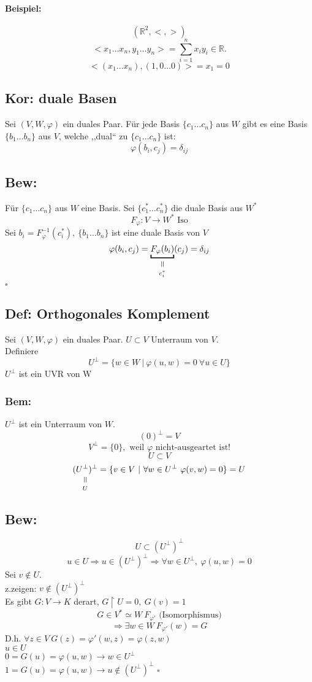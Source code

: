 \documentclass[titlepage,12pt,a4paper,ngerman]{report}
\newenvironment{bew}[1]{\subsection{Bew: #1}}{\hfill$\square$}
\newcommand{\Bew}[2]{\begin{bew}{#1}#2\end{bew}}
\newcommand{\verteq}{\rotatebox{90}{$\,=$}}
\newcommand{\equalto}[2]{\underset{\scriptstyle\overset{\mkern4mu\verteq}{#2}}{#1}}
\newcommand{\tx}[1]{\textrm{#1}}
\begin{document}
\paragraph{Beispiel:}
$$(\mathbb R^2, <, > )$$
$$<x_1 \dots x_n, y_1 \dots y_n> = \sum_{i=1}^n x_i y_i \in \mathbb R.$$
$$<(x_1 \dots x_n), (1, 0 \dots 0)> = x_1 = 0$$

\subsection{Kor: duale Basen}
Sei $(V,W,\varphi)$ ein duales Paar. Für jede Basis $\{c_1 \dots c_n\}$ aus $W$ gibt es eine Basis $\{b_1 \dots b_n\}$ aus $V$, welche ,,dual`` zu $\{c_1 \dots c_n\}$ ist:
$$\varphi(b_i, c_j) = \delta_{ij}$$

\Bew{}{
	Für $\{c_1 \dots c_n\}$ aus $W$ eine Basis.
	Sei $\{c_1^* \dots c_n^*\}$ die duale Basis aus $W^*$
	$$F_\varphi: V \to W^* \tx{ Iso}$$
	Sei $b_i = F_\varphi^{-1}(c_i^*),\ \{b_1 \dots b_n\}$ ist eine duale Basis von $V$
	$$\varphi(b_i, c_j) = \equalto{\underbracket{F_\varphi(b_i)}}{c_i^*}(c_j) = \delta_{ij}$$
}

\subsection{Def: Orthogonales Komplement}
Sei $(V,W,\varphi)$ ein duales Paar. $U \subset V$ Unterraum von $V$.\\
Definiere $$U^\perp = \{w \in W \ |\  \varphi (u,w) = 0\ \forall u \in U \}$$
$ U^\perp $ ist ein UVR von W
\subsubsection*{Bem:}
$U^\perp$ ist ein Unterraum von $W$.
$$(0)^\perp = V$$ %
$$V^\perp = \{0\}, \tx{ weil $\varphi$ nicht-ausgeartet ist!}$$
$$U \subset V$$
$$\equalto{(U^\perp)^\perp}{U} = \{v \in V \ | \  \forall w \in U^\perp\ \varphi(v,w) = 0 \} = U$$
\Bew{}{
	$$U\subset (U^\perp)^\perp$$
	$$u \in U \Rightarrow  u \in (U^\perp)^\perp \Rightarrow \forall w \in U^\perp,\ \varphi(u,w) = 0$$
	Sei $v \notin U.$\\
	z.zeigen: $v \notin (U^\perp)^\perp$\\
	Es gibt $G: V \to K$ derart, $G\upharpoonright U = 0,\ G(v) = 1$
	$$G \in V^* \simeq W\ F_{\varphi'} \tx{ (Isomorphismus)}$$
	$$\Rightarrow \exists w \in W\ F_{\varphi'}(w) = G$$
	D.h. $\forall z \in V\ G (z) = \varphi' (w,z) = \varphi(z,w)$\\
	$u \in U$\\
	$ 0 = G(u) = \varphi(u,w) \rightarrow w \in U^\perp $\\
	$ 1 = G(u) = \varphi(u,w) \rightarrow u \notin (U^\perp)^\perp $
}
\end{document}

